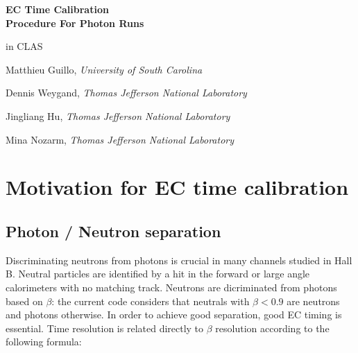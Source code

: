 \documentclass [12pt,letterpaper]{article}
\begin{document}
\begin{titlepage}
\begin{center}
{\huge \bf EC Time Calibration}
\\
{\huge \bf Procedure For Photon Runs}

\vspace{0.5 cm}
{\huge in CLAS}

\vspace{3cm}
{\large  Matthieu Guillo, \em University of South Carolina}

\vspace{0.5 cm}
{\large  Dennis Weygand, \em Thomas Jefferson National Laboratory}

\vspace{0.5 cm}
{\large Jingliang Hu, \em Thomas Jefferson National Laboratory}

\vspace{0.5 cm}
{\large Mina Nozarm, \em Thomas Jefferson National Laboratory}

\end{center}
\end{titlepage}
 
\newpage

\tableofcontents   %
\newpage
\listoffigures     %
\newpage


\section{Motivation for EC time calibration}

\subsection{Photon / Neutron separation}
Discriminating neutrons from photons is crucial in many channels studied in Hall B. Neutral particles are identified by a hit in the forward or large angle calorimeters with no matching track. Neutrons are dicriminated from photons based on $\beta$: the current code considers that neutrals with $\beta < 0.9$ are neutrons and photons otherwise.
In order to achieve good separation, good EC timing is essential. Time resolution is related directly to $\beta$ resolution according to the following formula:
\end{document}
